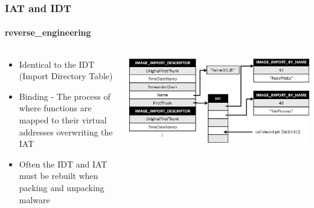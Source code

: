 \documentclass[aspectratio=169]{beamer}
\begin{document}
\begin{frame}
  \frametitle{IAT and IDT}
  \framesubtitle{reverse\_engineering}
  \begin{columns}
    \begin{column}{.4\textwidth}
      \begin{itemize}
        \item{Identical to the IDT (Import Directory Table)}
        \item{Binding - The process of where functions are mapped to their
            virtual addresses overwriting the IAT}
        \item{Often the IDT and IAT must be rebuilt when packing and unpacking malware}
      \end{itemize}
    \end{column}
    \hfill
    \begin{column}{.6\textwidth}
      \begin{center}
        \includegraphics[scale=0.2]{IAT}
      \end{center}
    \end{column}
  \end{columns}
\end{frame}
\end{document}
